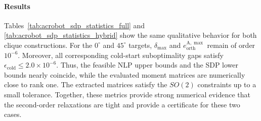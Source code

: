 \begin{table}[H]
    \centering
    \caption{Results of the Acrobot trajectory optimization using the
    special multi-body clique construction
    \(\bm{z}_{\mathrm{A}}(\mathcal I_1^{\mathrm{A}})\),
    \(\bm{z}_{\mathrm{A}}(\mathcal I_2^{\mathrm{A}})\),
    \(\bm{z}_{\mathrm{A}}(\mathcal I_{\mathrm{dyn},k}^{\mathrm{A}})\), and
    \(\bm{z}_{\mathrm{A}}(\mathcal I_{\mathrm{kin},k}^{\mathrm{A}})\).
    All metrics are defined as in
    Table~\ref{tab:acrobot_sdp_statistics_full}.}
    \label{tab:acrobot_sdp_statistics_hybrid}
    \setlength{\tabcolsep}{6pt}
    \renewcommand{\arraystretch}{1.15}
\end{table}

\paragraph{Results}

Tables~\ref{tab:acrobot_sdp_statistics_full} and
\ref{tab:acrobot_sdp_statistics_hybrid} show the same qualitative behavior for
both clique constructions. For the $0^\circ$ and $45^\circ$ targets,
$\delta_{\max}$ and $e_{\mathrm{orth}}^{\mathrm A,\max}$ remain of
order $10^{-6}$. Moreover, all corresponding cold-start suboptimality gaps
satisfy $\epsilon_{\mathrm{cold}}\leq2.0\times10^{-6}$. Thus, the feasible NLP
upper bounds and the SDP lower bounds nearly coincide, while the evaluated
moment matrices are numerically close to rank one. The extracted matrices
satisfy the $SO(2)$ constraints up to a small tolerance. Together, these
metrics provide strong numerical evidence that the second-order relaxations
are tight and provide a certificate for these two cases.

